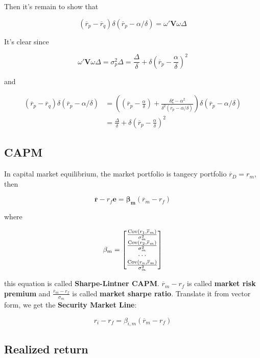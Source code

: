 \documentclass{article}
\begin{document}
Then it's remain to show that

\[ (\overline{r}_p-\overline{r}_q)\delta(\overline{r}_p-\alpha/\delta)=\omega'\mathbf{V}\omega\Delta \]

It's clear since

\[ \omega'\mathbf{V}\omega \Delta=\sigma_p^2\Delta=\frac{\Delta}{\delta}+\delta(\overline{r}_p-\frac{\alpha}{\delta})^2 \]

and

\[ \begin{aligned}
  (\overline{r}_p-\overline{r}_q)\delta(\overline{r}_p-\alpha/\delta)&=
  ((\overline{r}_p-\frac{\alpha}{\delta})+\frac{\delta\xi-\alpha^2}{\delta^2(\overline{r}_p-\alpha/\delta)})\delta(\overline{r}_p-\alpha/\delta)
  \\&=\frac{\Delta}{\delta}+\delta(\overline{r}_p-\frac{\alpha}{\delta})^2
\end{aligned} \]

\hypertarget{capm-1}{%
\subsection{CAPM}\label{capm-1}}

In capital market equilibrium, the market portfolio is tangecy portfolio
\(\overline{r}_D={r}_m\), then

\[ \bm{\mathbf{\overline{r}-\mathit{r_f}e}}=\bm{\mathbf{\beta_m}}(\overline{r}_m-r_f) \]

where

\[ \beta_m=\begin{bmatrix}
  \frac{\operatorname{Cov}(r_1,\overline{r}_m)}{\sigma^2_m}\\
  \frac{\operatorname{Cov}(r_2,\overline{r}_m)}{\sigma^2_m}\\
  \cdots\\
  \frac{\operatorname{Cov}(r_n,\overline{r}_m)}{\sigma^2_m}\\
\end{bmatrix} \]

this equation is called \textbf{Sharpe-Lintner CAPM}.
\(\overline{r}_m-r_f\) is called \textbf{market risk premium} and
\(\frac{\overline{r}_m-r_f}{\sigma_m}\) is called \textbf{market sharpe
ratio}. Translate it from vector form, we get the \textbf{Security
Market Line}:

\[ 
r_i-r_f=\beta_{i,m}(\overline{r}_m-r_f) 
\]

\hypertarget{realized-return}{%
\subsection{Realized return}\label{realized-return}}
\end{document}

